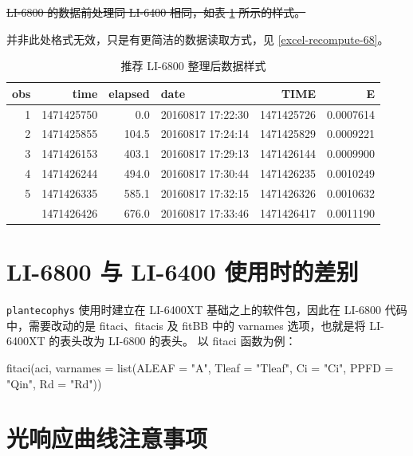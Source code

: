 \documentclass[
]{krantz}
\makeatletter
\newenvironment{Shaded}{\begin{snugshade}}{\end{snugshade}}
\newcommand{\AttributeTok}[1]{\textcolor[rgb]{0.77,0.63,0.00}{#1}}
\newcommand{\FunctionTok}[1]{\textcolor[rgb]{0.00,0.00,0.00}{#1}}
\newcommand{\NormalTok}[1]{#1}
\newcommand{\StringTok}[1]{\textcolor[rgb]{0.31,0.60,0.02}{#1}}
\newenvironment{kframe}{%
\medskip{}
\setlength{\fboxsep}{.8em}
 \def\at@end@of@kframe{}%
 \ifinner\ifhmode%
  \def\at@end@of@kframe{\end{minipage}}%
  \begin{minipage}{\columnwidth}%
 \fi\fi%
 \def\FrameCommand##1{\hskip\@totalleftmargin \hskip-\fboxsep
 \colorbox{shadecolor}{##1}\hskip-\fboxsep
     \hskip-\linewidth \hskip-\@totalleftmargin \hskip\columnwidth}%
 \MakeFramed {\advance\hsize-\width
   \@totalleftmargin\z@ \linewidth\hsize
   \@setminipage}}%
 {\par\unskip\endMakeFramed%
 \at@end@of@kframe}
\renewenvironment{Shaded}{\begin{kframe}}{\end{kframe}}
\makeatother
\begin{document}
\sout{LI-6800 的数据前处理同 LI-6400 相同，如表 \ref{tab:head6800} 所示的样式。}

并非此处格式无效，只是有更简洁的数据读取方式，见 \ref{excel-recompute-68}。

\begin{longtable}[t]{rrrlrr}
\caption{\label{tab:head6800}推荐 LI-6800 整理后数据样式}\\
\toprule
obs & time & elapsed & date & TIME & E\\
\midrule
1 & 1471425750 & 0.0 & 20160817 17:22:30 & 1471425726 & 0.0007614\\
2 & 1471425855 & 104.5 & 20160817 17:24:14 & 1471425829 & 0.0009221\\
3 & 1471426153 & 403.1 & 20160817 17:29:13 & 1471426144 & 0.0009900\\
4 & 1471426244 & 494.0 & 20160817 17:30:44 & 1471426235 & 0.0010249\\
5 & 1471426335 & 585.1 & 20160817 17:32:15 & 1471426326 & 0.0010632\\
\addlinespace
6 & 1471426426 & 676.0 & 20160817 17:33:46 & 1471426417 & 0.0011190\\
\bottomrule
\end{longtable}

\hypertarget{dif}{%
\section{LI-6800 与 LI-6400 使用时的差别}\label{dif}}

\texttt{plantecophys} 使用时建立在 LI-6400XT 基础之上的软件包，因此在 LI-6800 代码中，需要改动的是 fitaci、fitacis 及 fitBB 中的 varnames 选项，也就是将 LI-6400XT 的表头改为 LI-6800 的表头。
以 fitaci 函数为例：

\begin{Shaded}
\begin{Highlighting}[]
 \FunctionTok{fitaci}\NormalTok{(aci, }\AttributeTok{varnames =} 
        \FunctionTok{list}\NormalTok{(}\AttributeTok{ALEAF =} \StringTok{"A"}\NormalTok{, }\AttributeTok{Tleaf =} \StringTok{"Tleaf"}\NormalTok{, }\AttributeTok{Ci =} \StringTok{"Ci"}\NormalTok{, }
          \AttributeTok{PPFD  =} \StringTok{"Qin"}\NormalTok{, }\AttributeTok{Rd =} \StringTok{"Rd"}\NormalTok{))}
\end{Highlighting}
\end{Shaded}

\hypertarget{notice}{%
\section{光响应曲线注意事项}\label{notice}}
\end{document}

